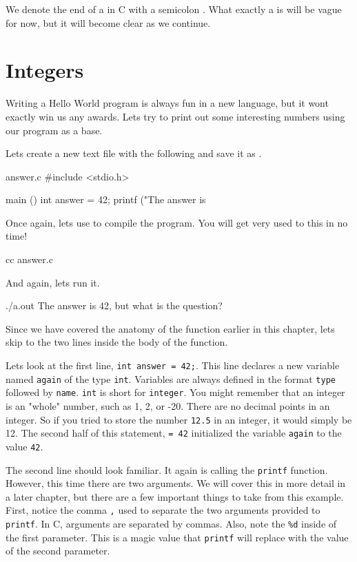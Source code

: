 We denote the end of a  in C with a semicolon \ident{;}.  What
exactly a  is will be vague for now, but it will become
clear as we continue.

\section{Integers}

Writing a Hello World program is always fun in a new language, but it wont
exactly win us any awards. Lets try to print out some interesting numbers
using our program as a base.

Lets create a new text file with the following and save it as .

\begin{code}{answer.c}
#include <stdio.h>

main ()
{
    int answer = 42;
    printf ("The answer is %
}
\end{code}

Once again, lets use  to compile the program. You will get very
used to this in no time!

\begin{Terminal}
cc answer.c
\end{Terminal}

And again, lets run it.

\begin{Terminal}
./a.out
The answer is 42, but what is the question?
\end{Terminal}

Since we have covered the anatomy of the  function earlier in this
chapter, lets skip to the two lines inside the body of the function.

Lets look at the first line, \verb|int answer = 42;|. This line declares a new
variable named \verb|again| of the type \verb|int|. Variables are always
defined in the format \verb|type| followed by \verb|name|. \verb|int| is short
for \verb|integer|.  You might remember that an integer is an "whole" number,
such as 1, 2, or -20.  There are no decimal points in an integer. So if you
tried to store the number \verb|12.5| in an integer, it would simply be 12. The
second half of this statement, \verb|= 42| initialized the variable
\verb|again| to the value \verb|42|.

The second line should look familiar. It again is calling the \verb|printf|
function. However, this time there are two arguments. We will cover this in
more detail in a later chapter, but there are a few important things to take
from this example. First, notice the comma \verb|,| used to separate the
two arguments provided to \verb|printf|. In C, arguments are separated by
commas. Also, note the \verb|%d| inside of the first parameter. This is a
magic value that \verb|printf| will replace with the value of the second
parameter.

